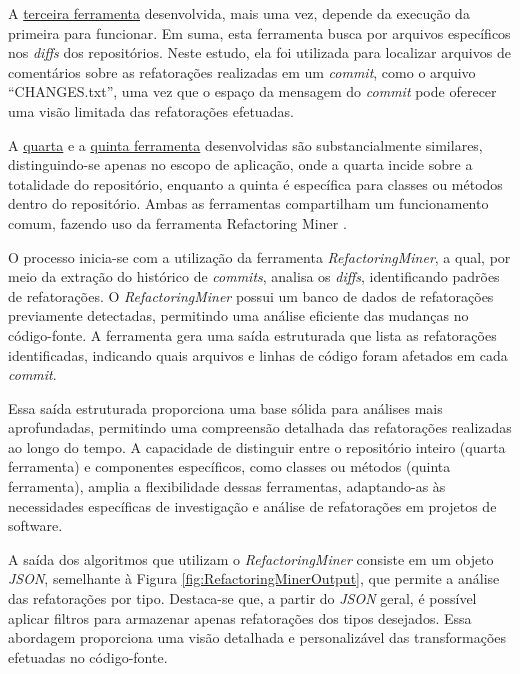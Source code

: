 A \href{https://github.com/BrenoFariasdaSilva/Scientific-Research/blob/main/PyDriller/Scripts/track_files.py}{terceira ferramenta} desenvolvida, mais uma vez, depende da execução da primeira para funcionar. Em suma, esta ferramenta busca por arquivos específicos nos \textit{diffs} dos repositórios. Neste estudo, ela foi utilizada para localizar arquivos de comentários sobre as refatorações realizadas em um \textit{commit}, como o arquivo ``CHANGES.txt'', uma vez que o espaço da mensagem do \textit{commit} pode oferecer uma visão limitada das refatorações efetuadas.

A \href{https://github.com/BrenoFariasdaSilva/Scientific-Research/blob/main/PyDriller/Scripts/track_files.py}{quarta} e a \href{https://github.com/BrenoFariasdaSilva/Scientific-Research/blob/main/RefactoringMiner/metrics_evolution_refactors.py}{quinta ferramenta} desenvolvidas são substancialmente similares, distinguindo-se apenas no escopo de aplicação, onde a quarta  incide sobre a totalidade do repositório, enquanto a quinta é específica para classes ou métodos dentro do repositório. Ambas as ferramentas compartilham um funcionamento comum, fazendo uso da ferramenta Refactoring Miner \cite{Tsantalis:ICSE:2018:RefactoringMiner}.

O processo inicia-se com a utilização da ferramenta \textit{RefactoringMiner}, a qual, por meio da extração do histórico de \textit{commits}, analisa os \textit{diffs}, identificando padrões de refatorações. O \textit{RefactoringMiner} possui um banco de dados de refatorações previamente detectadas, permitindo uma análise eficiente das mudanças no código-fonte. A ferramenta gera uma saída estruturada que lista as refatorações identificadas, indicando quais arquivos e linhas de código foram afetados em cada \textit{commit}.

Essa saída estruturada proporciona uma base sólida para análises mais aprofundadas, permitindo uma compreensão detalhada das refatorações realizadas ao longo do tempo. A capacidade de distinguir entre o repositório inteiro (quarta ferramenta) e componentes específicos, como classes ou métodos (quinta ferramenta), amplia a flexibilidade dessas ferramentas, adaptando-as às necessidades específicas de investigação e análise de refatorações em projetos de software.

A saída dos algoritmos que utilizam o \textit{RefactoringMiner} consiste em um objeto \textit{JSON}, semelhante à Figura \ref{fig:RefactoringMinerOutput}, que permite a análise das refatorações por tipo. Destaca-se que, a partir do \textit{JSON} geral, é possível aplicar filtros para armazenar apenas refatorações dos tipos desejados. Essa abordagem proporciona uma visão detalhada e personalizável das transformações efetuadas no código-fonte.

